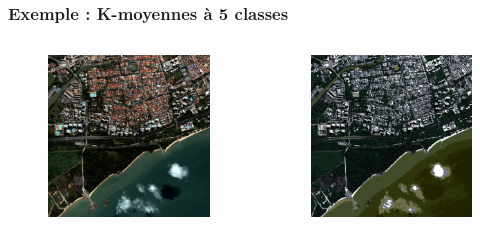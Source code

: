 \documentclass[compress]{beamer}
\begin{document}
\begin{frame}
\frametitle{Exemple : K-moyennes à 5 classes }
\begin{columns}
\begin{column}{0.5\textwidth}
\begin{figure}[]
  \includegraphics[width=1.0\textwidth]{radio2-extract-3b.jpg}
\end{figure}
\end{column}
\begin{column}{0.5\textwidth}
\begin{figure}[]
  \includegraphics[width=1.0\textwidth]{kmeans-5-classes.png}
\end{figure}
\end{column}
\end{columns}
\end{frame}
\end{document}
